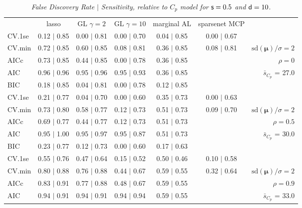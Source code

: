 \documentclass[12pt]{article}
\newcommand{\mr}[1]{\mathrm{#1}}
\newcommand{\bm}[1]{\mathbf{#1}}
\begin{document}
\begin{table}[p]\vspace{-.5cm}
\caption[l]{\label{sens}\it False Discovery Rate $\mid$ Sensitivity, relative to $C_p$ model  for ${\sf s}=0.5$ and ${\sf d}=10$.}
\vspace{-.5cm}
\small{}
\begin{center}
\begin{tabular}{l*{5}{c}|r}
 & lasso & GL $\gamma=2$ & GL $\gamma=10$ & marginal AL & sparsenet MCP  & \\
 \cline{1-7}
CV.1se & 0.12 $\mid$ 0.85 & 0.00 $\mid$ 0.81 & 0.00 $\mid$ 0.70 & 0.04 $\mid$ 0.85 & 0.00 $\mid$ 0.67 &\\
CV.min & 0.72 $\mid$ 0.85 & 0.60 $\mid$ 0.85 & 0.08 $\mid$ 0.81 & 0.36 $\mid$ 0.85 & 0.08 $\mid$ 0.81 &  $\mr{sd}(\bm{\mu})/\sigma=2$ \\
AICc & 0.73 $\mid$ 0.85 & 0.44 $\mid$ 0.85 & 0.00 $\mid$ 0.78 & 0.36 $\mid$ 0.85 & & $\rho=0$ \\
AIC & 0.96 $\mid$ 0.96 & 0.95 $\mid$ 0.96 & 0.95 $\mid$ 0.93 & 0.36 $\mid$ 0.85 & & \multirow{2}{*}{$\bar{s}_{C_p}$ = 27.0} \\
BIC & 0.18 $\mid$ 0.85 & 0.04 $\mid$ 0.81 & 0.00 $\mid$ 0.78 & 0.12 $\mid$ 0.85 & & \\
 \hline 
CV.1se & 0.21 $\mid$ 0.77 & 0.04 $\mid$ 0.70 & 0.00 $\mid$ 0.60 & 0.35 $\mid$ 0.73 & 0.00 $\mid$ 0.63 &\\
CV.min & 0.73 $\mid$ 0.80 & 0.58 $\mid$ 0.77 & 0.12 $\mid$ 0.73 & 0.51 $\mid$ 0.73 & 0.09 $\mid$ 0.70 &  $\mr{sd}(\bm{\mu})/\sigma=2$ \\
AICc & 0.69 $\mid$ 0.77 & 0.44 $\mid$ 0.77 & 0.12 $\mid$ 0.73 & 0.51 $\mid$ 0.73 & & $\rho=0.5$ \\
AIC & 0.95 $\mid$ 1.00 & 0.95 $\mid$ 0.97 & 0.95 $\mid$ 0.87 & 0.51 $\mid$ 0.73 & & \multirow{2}{*}{$\bar{s}_{C_p}$ = 30.0} \\
BIC & 0.23 $\mid$ 0.77 & 0.12 $\mid$ 0.73 & 0.00 $\mid$ 0.60 & 0.17 $\mid$ 0.63 & & \\
 \hline 
CV.1se & 0.55 $\mid$ 0.76 & 0.47 $\mid$ 0.64 & 0.15 $\mid$ 0.52 & 0.50 $\mid$ 0.46 & 0.10 $\mid$ 0.58 &\\
CV.min & 0.80 $\mid$ 0.88 & 0.76 $\mid$ 0.88 & 0.44 $\mid$ 0.67 & 0.59 $\mid$ 0.55 & 0.32 $\mid$ 0.64 &  $\mr{sd}(\bm{\mu})/\sigma=2$ \\
AICc & 0.83 $\mid$ 0.91 & 0.77 $\mid$ 0.88 & 0.48 $\mid$ 0.67 & 0.59 $\mid$ 0.55 & & $\rho=0.9$ \\
AIC & 0.94 $\mid$ 0.91 & 0.94 $\mid$ 0.91 & 0.94 $\mid$ 0.94 & 0.59 $\mid$ 0.55 & & \multirow{2}{*}{$\bar{s}_{C_p}$ = 33.0} \\

\end{tabular}
\end{center}
\end{table}
\end{document}
